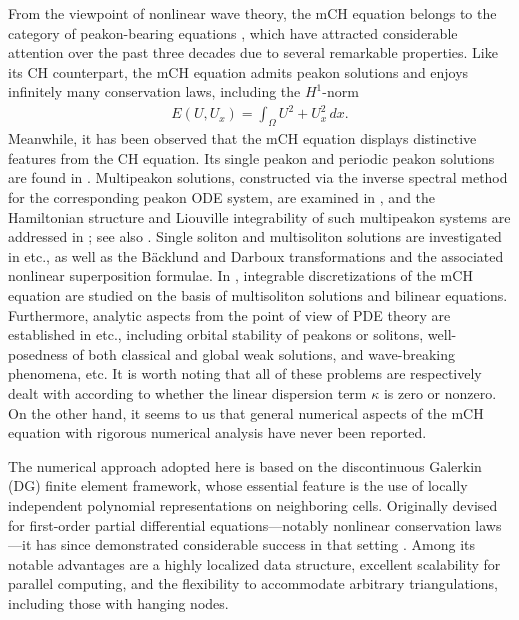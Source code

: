 \documentclass[11pt]{article}
\numberwithin{equation}{section}
\begin{document}
From the viewpoint of nonlinear wave theory, the mCH equation belongs to the category of peakon-bearing equations \cite{lundmark2022view}, which have attracted considerable attention over the past three decades due to several remarkable properties. Like its CH counterpart, the mCH equation admits peakon solutions \cite{Chang2018CMP,GuiCIMP2013,QuCMP2013} and enjoys infinitely many conservation laws, including the $H^1$-norm
\begin{align*}
E(U, U_x)=\int_{\Omega}U^2+U_x^2 \,dx.
\end{align*}
Meanwhile, it has been observed that the mCH  equation displays distinctive features from the CH equation.
Its single peakon and periodic peakon solutions are found in \cite{GuiCIMP2013,QuCMP2013}.
 Multipeakon solutions, constructed via the inverse spectral method for the corresponding peakon ODE system, are examined in \cite{Chang2018CMP}, and the Hamiltonian structure and Liouville integrability of such multipeakon systems are addressed in \cite{chang2016lax,chang2017liouville}; see also \cite{Anco2018DCDSS,chang2020isospectral, chang2026mch}. Single soliton and multisoliton solutions are investigated in \cite{MatsunoJMP2013,MatsunoJPA2014,niu2025darboux,Wang2020JPA} etc., as well as the B\"acklund and Darboux transformations and the associated nonlinear superposition formulae. In \cite{sheng2022mch,sheng2024mch}, integrable discretizations of the mCH equation are studied on the basis of multisoliton solutions and bilinear equations.
 Furthermore, analytic aspects from the point of view of PDE theory are established in \cite{chen2015AdvM,Gao2018DCDSS,GuiCIMP2013,li2024orbital,QuCMP2013,yang2005global} etc., including orbital stability of peakons or solitons, well-posedness of both classical and global weak solutions, and wave-breaking phenomena, etc.
It is worth noting that all of these problems are respectively dealt with according to whether  the linear dispersion term $\kappa$ is zero or nonzero. On the other hand, it seems to us that general numerical aspects of the mCH equation with rigorous numerical analysis have never been reported.


 The numerical approach adopted here is based on the discontinuous Galerkin (DG) finite element framework, whose essential feature is the use of locally independent polynomial representations on neighboring cells. Originally devised for first-order partial differential equations—notably nonlinear conservation laws—it has since demonstrated considerable success in that setting \cite{Cockburn1989, Cockburn1998}. Among its notable advantages are a highly localized data structure, excellent scalability for parallel computing, and the flexibility to accommodate arbitrary triangulations, including those with hanging nodes.
\end{document}
